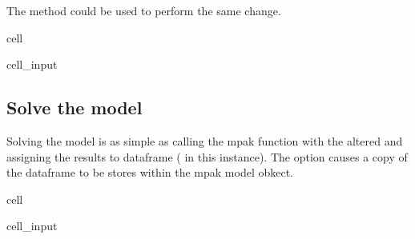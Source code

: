 \documentclass[letterpaper,10pt,english]{jupyterBook}
\begin{document}
\sphinxAtStartPar
The  method  could be used to perform the same change.

\begin{sphinxuseclass}{cell}\begin{sphinxVerbatimInput}

\begin{sphinxuseclass}{cell_input}
\begin{sphinxVerbatim}[commandchars=\\\{\}]
    
\end{sphinxVerbatim}

\end{sphinxuseclass}\end{sphinxVerbatimInput}

\end{sphinxuseclass}

\subsection{Solve the model}
\label{\detokenize{content/05_WBModels/MoreComplexScenarios:solve-the-model}}
\sphinxAtStartPar
Solving the model is as simple as calling the mpak function with the altered  and assigning the results to dataframe ( in this instance).  The  option causes a copy of the dataframe to be stores within the mpak model obkect.

\begin{sphinxuseclass}{cell}\begin{sphinxVerbatimInput}

\begin{sphinxuseclass}{cell_input}
\begin{sphinxVerbatim}[commandchars=\\\{\}]
   
\end{sphinxVerbatim}

\end{sphinxuseclass}\end{sphinxVerbatimInput}

\end{sphinxuseclass}
\end{document}
